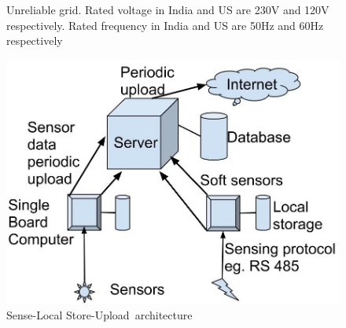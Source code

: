 \documentclass[10pt]{sensys-proc}
\newcommand{\paradigm}{Sense-Local Store-Upload}
\newcommand{\paradigms}{Sense-Local Store-Upload~}
\begin{document}
\begin{figure}[t!]
                            
     \vspace{-3mm}
   
    \caption{Unreliable grid. Rated voltage in India and US are 230V and 120V respectively. Rated frequency in India and US are 50Hz and 60Hz respectively}

    \label{fig:unreliable}

\end{figure}

%   

\begin{figure}

\centering \includegraphics[scale=0.12]{./figures/architecture.jpg}
\vspace{-2mm}
\caption{\paradigms architecture}
\vspace{-2mm}
\label{fig:architecture}
\end{figure}
\end{document}
